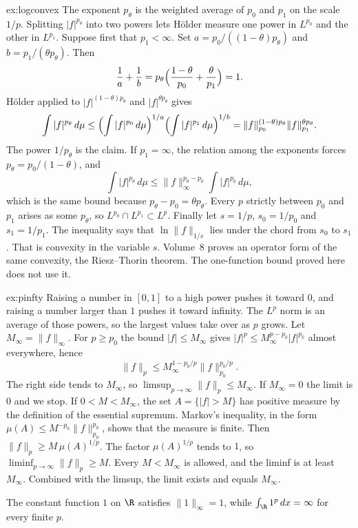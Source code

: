 \begin{solution}{ex:logconvex}
\idea The exponent $p_\theta$ is the weighted average of $p_0$ and $p_1$ on the scale $1/p$. Splitting $|f|^{p_\theta}$ into two powers lets Hölder measure one power in $L^{p_0}$ and the other in $L^{p_1}$.
\writeup Suppose first that $p_1<\infty$. Set $a=p_0/((1-\theta)p_\theta)$ and $b=p_1/(\theta p_\theta)$. Then
\[\frac1a+\frac1b=p_\theta\Bigl(\frac{1-\theta}{p_0}+\frac\theta{p_1}\Bigr)=1.\]
Hölder applied to $|f|^{(1-\theta)p_\theta}$ and $|f|^{\theta p_\theta}$ gives
\[\int|f|^{p_\theta}\,d\mu\le\Bigl(\int|f|^{p_0}\,d\mu\Bigr)^{1/a}\Bigl(\int|f|^{p_1}\,d\mu\Bigr)^{1/b}=\|f\|_{p_0}^{(1-\theta)p_\theta}\|f\|_{p_1}^{\theta p_\theta}.\]
The power $1/p_\theta$ is the claim. If $p_1=\infty$, the relation among the exponents forces $p_\theta=p_0/(1-\theta)$, and
\[\int|f|^{p_\theta}\,d\mu\le\|f\|_\infty^{p_\theta-p_0}\int|f|^{p_0}\,d\mu,\]
which is the same bound because $p_\theta-p_0=\theta p_\theta$. Every $p$ strictly between $p_0$ and $p_1$ arises as some $p_\theta$, so $L^{p_0}\cap L^{p_1}\subset L^p$. Finally let $s=1/p$, $s_0=1/p_0$ and $s_1=1/p_1$. The inequality says that $\ln\|f\|_{1/s}$ lies under the chord from $s_0$ to $s_1$. That is convexity in the variable $s$. Volume~8 proves an operator form of the same convexity, the Riesz--Thorin theorem. The one-function bound proved here does not use it.
\end{solution}

\begin{solution}{ex:pinfty}
\idea Raising a number in $[0,1]$ to a high power pushes it toward $0$, and raising a number larger than $1$ pushes it toward infinity. The $L^p$ norm is an average of those powers, so the largest values take over as $p$ grows.
\writeup Let $M_\infty=\|f\|_\infty$. For $p\ge p_0$ the bound $|f|\le M_\infty$ gives $|f|^p\le M_\infty^{p-p_0}|f|^{p_0}$ almost everywhere, hence
\[\|f\|_p\le M_\infty^{1-p_0/p}\|f\|_{p_0}^{p_0/p}.\]
The right side tends to $M_\infty$, so $\limsup_{p\to\infty}\|f\|_p\le M_\infty$. If $M_\infty=0$ the limit is $0$ and we stop. If $0<M<M_\infty$, the set $A=\{|f|>M\}$ has positive measure by the definition of the essential supremum. Markov's inequality, in the form $\mu(A)\le M^{-p_0}\|f\|_{p_0}^{p_0}$, shows that the measure is finite. Then $\|f\|_p\ge M\,\mu(A)^{1/p}$. The factor $\mu(A)^{1/p}$ tends to $1$, so $\liminf_{p\to\infty}\|f\|_p\ge M$. Every $M<M_\infty$ is allowed, and the liminf is at least $M_\infty$. Combined with the limsup, the limit exists and equals $M_\infty$.

The constant function $1$ on $\R$ satisfies $\|1\|_\infty=1$, while $\int_\R 1^p\,dx=\infty$ for every finite $p$.
\end{solution}

